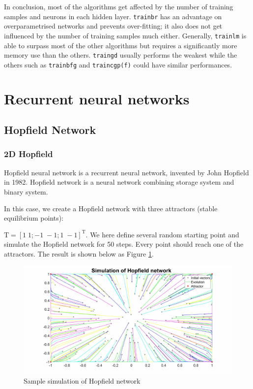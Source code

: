 \documentclass{article}
\begin{document}
In conclusion, most of the algorithms get affected by the number of training samples and neurons in each hidden layer. \verb|trainbr| has an advantage on overparametrised networks and prevents over-fitting; it also does not get influenced by the number of training samples much either. Generally, \verb|trainlm| is able to surpass most of the other algorithms but requires a significantly more memory use than the others. \verb|traingd| usually performs the weakest while the others such as \verb|trainbfg| and \verb|traincgp(f)| could have similar performances.


\section{Recurrent neural networks}

\subsection{Hopfield Network}

\subsubsection{2D Hopfield}
Hopfield neural network is a recurrent neural network, invented by John Hopfield in 1982. Hopfield network is a neural network combining storage system and binary system. 

In this case, we create a Hopfield network with three attractors (stable equilibrium points):

$\mathrm{T}=[1\;1;-1\;-1; 1\;-1]^{\mathrm{T}}$. We here define several random starting point and simulate the Hopfield network for 50 steps. Every point should reach one of the attractors. The result is shown below as Figure \ref{fig:similationhop1}.

\begin{figure}[h!]
  \centering
  \includegraphics[width=\textwidth]{lab2/simulation1.pdf}
  \caption{Sample simulation of Hopfield network}
  \label{fig:similationhop1}
\end{figure}
\end{document}
